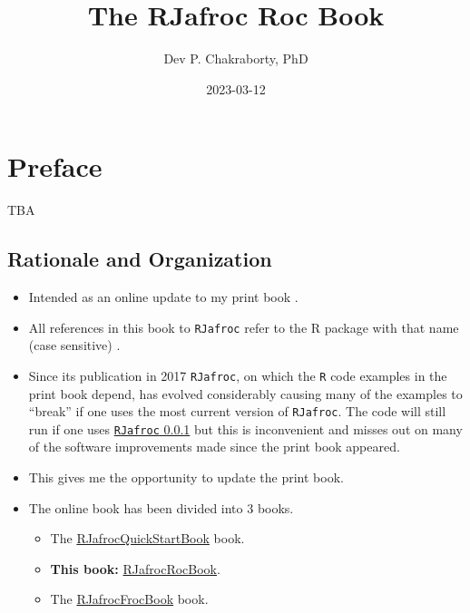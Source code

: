 \documentclass[
]{book}
\title{The RJafroc Roc Book}
\author{Dev P. Chakraborty, PhD}
\date{2023-03-12}
\providecommand{\tightlist}{%
  \setlength{\itemsep}{0pt}\setlength{\parskip}{0pt}}
\begin{document}
\maketitle

{
\setcounter{tocdepth}{1}
\tableofcontents
}
\hypertarget{preface}{%
\chapter*{Preface}\label{preface}}

TBA

\hypertarget{rationale-and-organization}{%
\section{Rationale and Organization}\label{rationale-and-organization}}

\begin{itemize}
\tightlist
\item
  Intended as an online update to my print book \citep{chakraborty2017observer}.
\item
  All references in this book to \texttt{RJafroc} refer to the R package with that name (case sensitive) \citep{R-RJafroc}.
\item
  Since its publication in 2017 \texttt{RJafroc}, on which the \texttt{R} code examples in the print book depend, has evolved considerably causing many of the examples to ``break'' if one uses the most current version of \texttt{RJafroc}. The code will still run if one uses \href{https://cran.r-project.org/src/contrib/Archive/RJafroc/}{\texttt{RJafroc} 0.0.1} but this is inconvenient and misses out on many of the software improvements made since the print book appeared.
\item
  This gives me the opportunity to update the print book.
\item
  The online book has been divided into 3 books.

  \begin{itemize}
  \tightlist
  \item
    The \href{https://dpc10ster.github.io/RJafrocQuickStart/}{RJafrocQuickStartBook} book.
  \item
    \textbf{This book:} \href{https://dpc10ster.github.io/RJafrocRocBook/}{RJafrocRocBook}.
  \item
    The \href{https://dpc10ster.github.io/RJafrocFrocBook/}{RJafrocFrocBook} book.
  \end{itemize}
\end{itemize}
\end{document}
